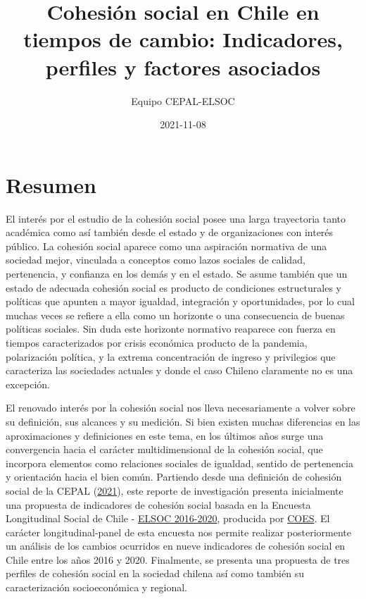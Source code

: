 \documentclass[
  12pt,
]{book}
\title{Cohesión social en Chile en tiempos de cambio: Indicadores, perfiles y factores asociados}
\author{Equipo CEPAL-ELSOC}
\date{2021-11-08}
\begin{document}
\maketitle

{
\hypersetup{linkcolor=}
\setcounter{tocdepth}{1}
\tableofcontents
}
\listoftables
\listoffigures
{}
\hypertarget{resumen}{%
\chapter*{Resumen}\label{resumen}}

El interés por el estudio de la cohesión social posee una larga trayectoria tanto académica como así también desde el estado y de organizaciones con interés público. La cohesión social aparece como una aspiración normativa de una sociedad mejor, vinculada a conceptos como lazos sociales de calidad, pertenencia, y confianza en los demás y en el estado. Se asume también que un estado de adecuada cohesión social es producto de condiciones estructurales y políticas que apunten a mayor igualdad, integración y oportunidades, por lo cual muchas veces se refiere a ella como un horizonte o una consecuencia de buenas políticas sociales. Sin duda este horizonte normativo reaparece con fuerza en tiempos caracterizados por crisis económica producto de la pandemia, polarización política, y la extrema concentración de ingreso y privilegios que caracteriza las sociedades actuales y donde el caso Chileno claramente no es una excepción.

El renovado interés por la cohesión social nos lleva necesariamente a volver sobre su definición, sus alcances y su medición. Si bien existen muchas diferencias en las aproximaciones y definiciones en este tema, en los últimos años surge una convergencia hacia el carácter multidimensional de la cohesión social, que incorpora elementos como relaciones sociales de igualdad, sentido de pertenencia y orientación hacia el bien común. Partiendo desde una definición de cohesión social de la CEPAL (\protect\hyperlink{ref-cepal_cohesion_2021}{2021}), este reporte de investigación presenta inicialmente una propuesta de indicadores de cohesión social basada en la Encuesta Longitudinal Social de Chile - \href{https://coes.cl/encuesta-panel/}{ELSOC 2016-2020}, producida por \href{https://coes.cl/}{COES}. El carácter longitudinal-panel de esta encuesta nos permite realizar posteriormente un análisis de los cambios ocurridos en nueve indicadores de cohesión social en Chile entre los años 2016 y 2020. Finalmente, se presenta una propuesta de tres perfiles de cohesión social en la sociedad chilena así como también su caracterización socioeconómica y regional.
\end{document}

